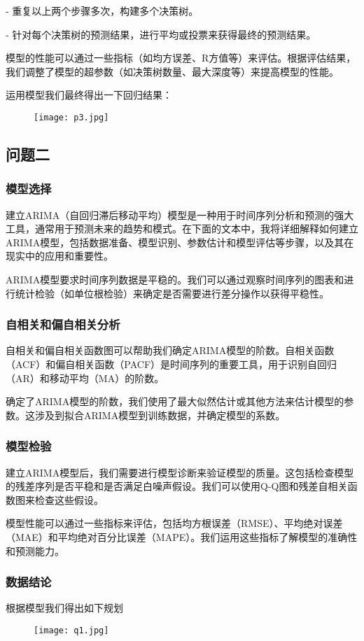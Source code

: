\documentclass[withoutpreface,bwprint]{cumcmthesis} %
\begin{document}
		- 重复以上两个步骤多次，构建多个决策树。
		
		- 针对每个决策树的预测结果，进行平均或投票来获得最终的预测结果。
		
		模型的性能可以通过一些指标（如均方误差、R方值等）来评估。根据评估结果，我们调整了模型的超参数（如决策树数量、最大深度等）来提高模型的性能。
		
		运用模型我们最终得出一下回归结果：
				\begin{figure}[H]
			\centering
			\texttt{[image: p3.jpg]}
		\end{figure}
		\subsection{问题二}
		\subsubsection{模型选择}
建立ARIMA（自回归滞后移动平均）模型是一种用于时间序列分析和预测的强大工具，通常用于预测未来的趋势和模式。在下面的文本中，我将详细解释如何建立ARIMA模型，包括数据准备、模型识别、参数估计和模型评估等步骤，以及其在现实中的应用和重要性。

ARIMA模型要求时间序列数据是平稳的。我们可以通过观察时间序列的图表和进行统计检验（如单位根检验）来确定是否需要进行差分操作以获得平稳性。

\subsubsection{自相关和偏自相关分析}

自相关和偏自相关函数图可以帮助我们确定ARIMA模型的阶数。自相关函数（ACF）和偏自相关函数（PACF）是时间序列的重要工具，用于识别自回归（AR）和移动平均（MA）的阶数。

确定了ARIMA模型的阶数，我们使用了最大似然估计或其他方法来估计模型的参数。这涉及到拟合ARIMA模型到训练数据，并确定模型的系数。
\subsubsection{模型检验}
建立ARIMA模型后，我们需要进行模型诊断来验证模型的质量。这包括检查模型的残差序列是否平稳和是否满足白噪声假设。我们可以使用Q-Q图和残差自相关函数图来检查这些假设。

模型性能可以通过一些指标来评估，包括均方根误差（RMSE）、平均绝对误差（MAE）和平均绝对百分比误差（MAPE）。我们运用这些指标了解模型的准确性和预测能力。
\subsubsection{数据结论}
根据模型我们得出如下规划
				\begin{figure}[H]
	\centering
	\texttt{[image: q1.jpg]}
\end{figure}
\end{document}
